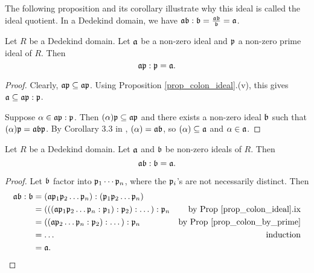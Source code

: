 The following proposition and its corollary illustrate why this ideal is called the ideal quotient.
In a Dedekind domain, we have $\frak a \frak b : \frak b = \frac {\frak a \frak b}{\frak b} = \frak a$.

\begin{proposition}
  \label{prop_colon_by_prime}
  Let $R$ be a Dedekind domain.
  Let $\frak a$ be a non-zero ideal and $\frak p$ a non-zero prime ideal of $R$. Then
  \[ \frak a \frak p : \frak p = \frak a. \]
\end{proposition}
\begin{proof}
  Clearly, $\frak a \frak p \subseteq \frak a \frak p$.
  Using Proposition \ref{prop_colon_ideal}.(v),
  this gives $\frak a \subseteq \frak a \frak p : \frak p$.
  
  Suppose $\alpha \in \frak a \frak p : \frak p$.
  Then $(\alpha)\frak p \subseteq \frak a \frak p$
  and there exists a non-zero ideal $\frak b$ such that $(\alpha)\frak p = \frak a \frak b \frak p$.
  By Corollary 3.3 in \cite{conrad}, $(\alpha) = \frak a \frak b$,
  so $(\alpha) \subseteq \frak a$ and $\alpha \in \frak a$.
\end{proof}

\begin{corollary}
  \label{cor_ab_colon_b_is_a}
  Let $R$ be a Dedekind domain.
  Let $\frak a$ and $\frak b$ be non-zero ideals of $R$. Then
  \[ \frak a \frak b : \frak b = \frak a. \]
\end{corollary}
\begin{proof}
  Let $\frak b$ factor into $\frak p_1 \cdots \frak p_n$, where the $\frak p_i$'s are not necessarily distinct.
  Then
  \begin{align*}
    \frak a \frak b : \frak b
      &= (\frak a \frak p_1 \frak p_2 \dots \frak p_n) : (\frak p_1 \frak p_2 \dots \frak p_n) \\
      &= (((\frak a \frak p_1 \frak p_2 \dots \frak p_n : \frak p_1) : \frak p_2) : \dots) : \frak p_n
        & \text{by Prop \ref{prop_colon_ideal}.ix} \\
      &= ((\frak a \frak p_2 \dots \frak p_n : \frak p_2) : \dots) : \frak p_n
        & \text{by Prop \ref{prop_colon_by_prime}} \\
      &= \dots & \text{induction} \\
      &= \frak a.
  \end{align*}
\end{proof}
